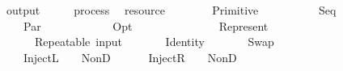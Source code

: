 \isamarkupfalse%
\ {\isachardoublequoteopen}output{\isachardoublequoteclose}\ {\isacharcolon}{\isacharcolon}\ {\isachardoublequoteopen}{\isacharparenleft}\ \ \ \ process\ {\isasymRightarrow}\isanewline
{}\ resource{\isachardoublequoteclose}\isanewline
\ \ \isanewline
\ \ \ \ {\isachardoublequoteopen}\ {\isacharparenleft}Primitive\ \ \ \ \ {\isacharequal}\ \isanewline
\ \ {\isacharbar}\ {\isachardoublequoteopen}\ {\isacharparenleft}Seq\ \ \ {\isacharequal}\ \ \isanewline
\ \ {\isacharbar}\ {\isachardoublequoteopen}\ {\isacharparenleft}Par\ \ \ {\isacharequal}\ \ \ {\isasymodot}\ \ \isanewline
\ \ {\isacharbar}\ {\isachardoublequoteopen}\ {\isacharparenleft}Opt\ \ \ {\isacharequal}\isanewline
\ \ \ \ \ \ \ \isanewline
\ \ {\isacharbar}\ {\isachardoublequoteopen}\ {\isacharparenleft}Represent\ \ {\isacharequal}\isanewline
\ \ \ \ \ \ Repeatable\ {\isacharparenleft}input\ \ {\isacharparenleft}\ \isanewline
\ \ {\isacharbar}\ {\isachardoublequoteopen}\ {\isacharparenleft}Identity\ \ {\isacharequal}\ \isanewline
\ \ {\isacharbar}\ {\isachardoublequoteopen}\ {\isacharparenleft}Swap\ \ \ {\isacharequal}\ \ {\isasymodot}\ \isanewline
\ \ {\isacharbar}\ {\isachardoublequoteopen}\ {\isacharparenleft}InjectL\ \ \ {\isacharequal}\ NonD\ \ \isanewline
\ \ {\isacharbar}\ {\isachardoublequoteopen}\ {\isacharparenleft}InjectR\ \ \ {\isacharequal}\ NonD\ \ \isanewline
